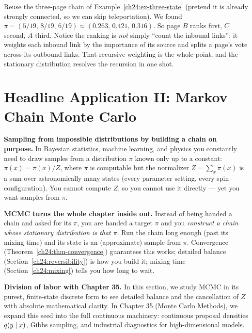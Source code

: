 \begin{example}
\label{ch24:ex-pagerank}
Reuse the three-page chain of Example~\ref{ch24:ex-three-state} (pretend it is
already strongly connected, so we can skip teleportation). We found
$\pi = (5/19,\,8/19,\,6/19) \approx (0.263,\,0.421,\,0.316)$. So page $B$ ranks
first, $C$ second, $A$ third. Notice the ranking is \emph{not} simply ``count the
inbound links'': it weights each inbound link by the importance of its source and
splits a page's vote across its outbound links. That recursive weighting is the
whole point, and the stationary distribution resolves the recursion in one shot.
\end{example}

\section{Headline Application II: Markov Chain Monte Carlo}
\label{ch24:mcmc}

\begin{applicationbox}
\textbf{Sampling from impossible distributions by building a chain on purpose.}
In Bayesian statistics, machine learning, and physics you constantly need to draw
samples from a distribution $\pi$ known only up to a constant:
$\pi(x) = \tilde\pi(x)/Z$, where $\tilde\pi$ is computable but the normalizer
$Z = \sum_x \tilde\pi(x)$ is a sum over astronomically many states (every
parameter setting, every spin configuration). You cannot compute $Z$, so you
cannot use it directly --- yet you want samples from $\pi$.

\textbf{MCMC turns the whole chapter inside out.} Instead of being handed a chain
and asked for its $\pi$, you are handed a target $\pi$ and you \emph{construct a
chain whose stationary distribution is that $\pi$}. Run the chain long enough
(past its mixing time) and its state is an (approximate) sample from $\pi$.
Convergence (Theorem~\ref{ch24:thm-convergence}) guarantees this works; detailed
balance (Section~\ref{ch24:reversibility}) is how you build it; mixing time
(Section~\ref{ch24:mixing}) tells you how long to wait.

\textbf{Division of labor with Chapter 35.} In this section, we study MCMC in its
purest, finite-state discrete form to see detailed balance and the cancellation of $Z$
with absolute mathematical clarity. In Chapter 35 (Monte Carlo Methods), we expand this
seed into the full continuous machinery: continuous proposal densities $q(y\mid x)$,
Gibbs sampling, and industrial diagnostics for high-dimensional models.
\end{applicationbox}

